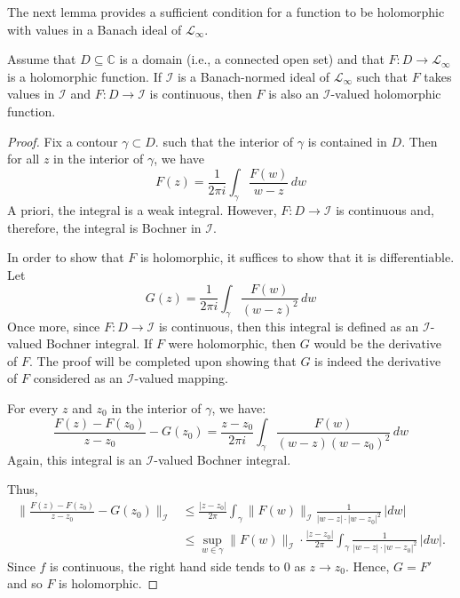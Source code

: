     The next lemma provides a sufficient condition for a function to be holomorphic with values in a Banach ideal of $\mathcal{L}_\infty$.
    \begin{lem}\label{banach holomorphic criteria} 
        Assume that $D \subseteq \mathbb{C}$ is a domain (i.e., a connected open set) and that $F:D\to \mathcal{L}_\infty$ is a holomorphic function.
        If $\mathcal{I}$ is a Banach-normed ideal of $\mathcal{L}_\infty$ such that $F$ takes values in $\mathcal{I}$ and $F:D\to \mathcal{I}$ is continuous, then $F$
        is also an $\mathcal{I}$-valued holomorphic function.
    \end{lem}
    \begin{proof} 
        Fix a contour $\gamma\subset D.$ such that the interior of $\gamma$ is contained in $D$. Then for all $z$ in the interior of $\gamma$, we have
        $$F(z)=\frac1{2\pi i}\int_{\gamma}\frac{F(w)}{w-z}\,dw$$
        A priori, the integral is a weak integral. However, $F:D\to\mathcal{I}$ is continuous and, therefore, the integral is Bochner in $\mathcal{I}.$

        In order to show that $F$ is holomorphic, it suffices to show that it is differentiable. Let
        $$G(z)=\frac1{2\pi i}\int_{\gamma}\frac{F(w)}{(w-z)^2}\,dw$$
        Once more, since $F:D\to \mathcal{I}$ is continuous, then this integral is defined as an $\mathcal{I}$-valued Bochner integral.
        If $F$ were holomorphic, then $G$ would be the derivative of $F$. The proof will be completed upon showing that
        $G$ is indeed the derivative of $F$ considered as an $\mathcal{I}$-valued mapping.
        
        For every $z$ and $z_0$ in the interior of $\gamma$, we have:
        $$\frac{F(z)-F(z_0)}{z-z_0}-G(z_0)=\frac{z-z_0}{2\pi i}\int_{\gamma}\frac{F(w)}{(w-z)(w-z_0)^2}\,dw$$
        Again, this integral is an $\mathcal{I}$-valued Bochner integral.

        Thus,
        \begin{align*}
            \Big\|\frac{F(z)-F(z_0)}{z-z_0}-G(z_0)\Big\|_{\mathcal{I}} &\leq \frac{|z-z_0|}{2\pi}\int_{\gamma}\|F(w)\|_{\mathcal{I}}\frac{1}{|w-z|\cdot|w-z_0|^2}\,|dw|\\
                                                                        &\leq \sup_{w\in\gamma}\|F(w)\|_{\mathcal{I}}\cdot \frac{|z-z_0|}{2\pi}\int_{\gamma}\frac{1}{|w-z|\cdot|w-z_0|^2}\,|dw|.
        \end{align*}
        Since $f$ is continuous, the right hand side tends to $0$ as $z\to z_0$. Hence, $G = F'$ and so $F$ is holomorphic.
    \end{proof}

